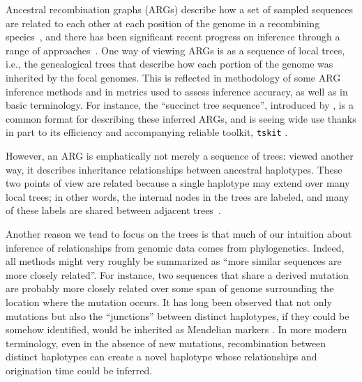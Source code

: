 \documentclass[10pt,twoside,lineno]{gsajnl}
\newcommand{\tskit}{\texttt{tskit}}
\begin{document}
Ancestral recombination graphs (ARGs) describe how a set of sampled sequences 
are related to each other at each position of the genome in a recombining
species~\citep{brandt2024promise,lewanski2024introduction,nielsen2024inference,
wong2024general}, and there has been significant recent progress 
on inference through a range of approaches~\citep{rasmussen2014genome,
speidel2019method,kelleher2019inferring,zhang2023biobankscale,deng2024robust,gunnarsson2024scalable}.
One way of viewing ARGs is as a sequence of local trees,
i.e., the genealogical trees that describe how each portion of the genome
was inherited by the focal genomes.
This is reflected in methodology of some ARG inference methods
and in metrics used to assess inference accuracy,
as well as in basic terminology.
For instance, 
the ``succinct tree sequence'',
introduced by \citet{kelleher2016efficient},
is a common format for describing these inferred ARGs,
and is seeing wide use thanks in part to its efficiency and accompanying reliable toolkit,
\tskit{} \citep{tskit,ralph2020efficiently}.

However, an ARG is emphatically not merely a sequence of trees:
viewed another way, it describes inheritance relationships between ancestral haplotypes.
These two points of view are related because a single haplotype
may extend over many local trees;
in other words, the internal nodes in the trees are labeled, and many of these labels
are shared between adjacent trees~\citep{wong2024general}.

Another reason we tend to focus on the trees is that
much of our intuition about inference of relationships from genomic data
comes from phylogenetics.
Indeed, all methods might very roughly be summarized as
``more similar sequences are more closely related''.
For instance, two sequences that share a derived mutation
are probably more closely related over some span of genome surrounding the location where the mutation occurs.
It has long been observed 
that not only mutations
but also the ``junctions'' between distinct haplotypes,
if they could be somehow identified,
would be inherited as Mendelian markers
\citep{fisher1954fuller,chapman2003model}.
In more modern terminology, 
even in the absence of new mutations,
recombination between distinct haplotypes can create a novel haplotype
whose relationships and origination time could be inferred.
\end{document}
